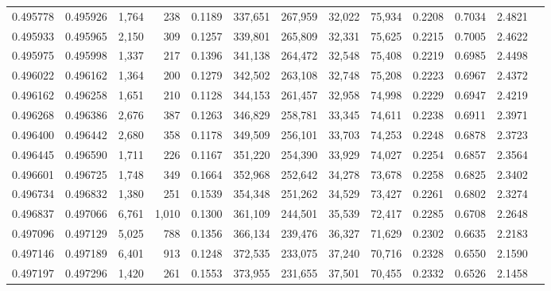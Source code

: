 \begin{tabular}{rrrrrrrrrrrrr}
0.495778 & 0.495926 & 1,764 &   238 &                                     0.1189 & 337,651 & 267,959 &  32,022 &  75,934 & 0.2208 & 0.7034 & 2.4821 \\
0.495933 & 0.495965 & 2,150 &   309 &                                     0.1257 & 339,801 & 265,809 &  32,331 &  75,625 & 0.2215 & 0.7005 & 2.4622 \\
0.495975 & 0.495998 & 1,337 &   217 &                                     0.1396 & 341,138 & 264,472 &  32,548 &  75,408 & 0.2219 & 0.6985 & 2.4498 \\
0.496022 & 0.496162 & 1,364 &   200 &                                     0.1279 & 342,502 & 263,108 &  32,748 &  75,208 & 0.2223 & 0.6967 & 2.4372 \\
0.496162 & 0.496258 & 1,651 &   210 &                                     0.1128 & 344,153 & 261,457 &  32,958 &  74,998 & 0.2229 & 0.6947 & 2.4219 \\
0.496268 & 0.496386 & 2,676 &   387 &                                     0.1263 & 346,829 & 258,781 &  33,345 &  74,611 & 0.2238 & 0.6911 & 2.3971 \\
0.496400 & 0.496442 & 2,680 &   358 &                                     0.1178 & 349,509 & 256,101 &  33,703 &  74,253 & 0.2248 & 0.6878 & 2.3723 \\
0.496445 & 0.496590 & 1,711 &   226 &                                     0.1167 & 351,220 & 254,390 &  33,929 &  74,027 & 0.2254 & 0.6857 & 2.3564 \\
0.496601 & 0.496725 & 1,748 &   349 &                                     0.1664 & 352,968 & 252,642 &  34,278 &  73,678 & 0.2258 & 0.6825 & 2.3402 \\
0.496734 & 0.496832 & 1,380 &   251 &                                     0.1539 & 354,348 & 251,262 &  34,529 &  73,427 & 0.2261 & 0.6802 & 2.3274 \\
0.496837 & 0.497066 & 6,761 & 1,010 &                                     0.1300 & 361,109 & 244,501 &  35,539 &  72,417 & 0.2285 & 0.6708 & 2.2648 \\
0.497096 & 0.497129 & 5,025 &   788 &                                     0.1356 & 366,134 & 239,476 &  36,327 &  71,629 & 0.2302 & 0.6635 & 2.2183 \\
0.497146 & 0.497189 & 6,401 &   913 &                                     0.1248 & 372,535 & 233,075 &  37,240 &  70,716 & 0.2328 & 0.6550 & 2.1590 \\
0.497197 & 0.497296 & 1,420 &   261 &                                     0.1553 & 373,955 & 231,655 &  37,501 &  70,455 & 0.2332 & 0.6526 & 2.1458 \\

\end{tabular}
